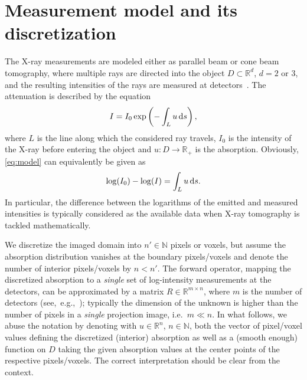 \documentclass[final]{siamltex}
\newcommand{\N}{\mathbb{N}}
\newcommand{\R}{\mathbb{R}}
\begin{document}
\section{Measurement model and its discretization}
\label{sec:mm}
The X-ray measurements are modeled either as parallel beam or cone beam tomography, where multiple rays are directed into the object $D \subset \R^d$, $d=2$ or $3$, and the resulting intensities of the rays are measured at detectors~\cite{Natterer01}. The attenuation is described by the equation
\begin{equation}
	\label{eq:model}
	I = I_0 \exp \left( - \int_{L} u \, {\rm d}s \right),
\end{equation}
where $L$ is the line along which the considered ray travels, $I_0$ is the intensity of the X-ray before entering the object and $u: D \to \R_+$ is the absorption. Obviously, \eqref{eq:model} can equivalently be given as
$$
\log(I_0) - \log(I) = \int_{L} u \, {\rm d} s.
$$
In particular, the difference between the logarithms of the  emitted and measured intensities is typically considered as the available data when X-ray tomography is tackled mathematically.

We discretize the imaged domain into $n' \in \N$ pixels or voxels, but assume the absorption distribution vanishes at the boundary pixels/voxels and denote the  number of interior pixels/voxels by $n < n'$. The forward operator, mapping the discretized absorption to a {\em single} set of log-intensity measurements at the detectors, can be approximated by a matrix $R \in \mathbb{R}^{m \times n}$, where $m$ is the  number of detectors (see,~e.g.,~\cite{Siltanen03}); typically the dimension of the unknown is higher than the number of pixels in a {\em single} projection image, i.e.~$m\ll n$. In what follows, we abuse the notation by denoting with $u \in \R^n$, $n \in \N$, both the vector of pixel/voxel values defining the discretized (interior) absorption as well as a (smooth enough) function on $D$ taking the given absorption values at the center points of the respective pixels/voxels. The correct interpretation should be clear from the context.
\end{document}
